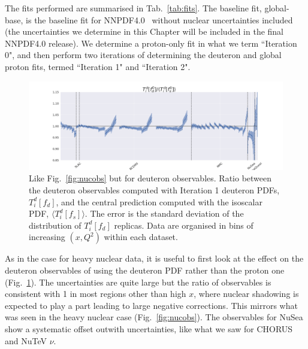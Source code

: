 The fits performed are summarised in Tab.~\ref{tab:fits}. The baseline fit, global-base, is the baseline fit for NNPDF4.0~\cite{EmanueleTalk} without nuclear uncertainties included (the uncertainties we determine in this Chapter will be included in the final NNPDF4.0 release). We determine a proton-only fit in what we term ``Iteration 0", and then perform two iterations of determining the deuteron and global proton fits, termed ``Iteration 1" and ``Iteration 2". 
\begin{figure}[h]
  \begin{center}
    \includegraphics[width=\linewidth, trim={4cm 0 4cm 0}]{nuclear/plots/observable_ratio_updated.png}
   \caption{ Like Fig.~\ref{fig:nucobs} but for deuteron observables. Ratio between the deuteron observables computed with Iteration 1 deuteron PDFs, $T_i^d[f_d]$, and the central prediction computed with the isoscalar PDF, $\langle T_i^d[f_s] \rangle$. The error is the standard deviation of the distribution of $T_i^d[f_d]$ replicas. Data are organised in bins of increasing $(x, Q^2)$ within each dataset. 
    \label{fig:deutobs} }
  \end{center}
\end{figure}

As in the case for heavy nuclear data, it is useful to first look at the effect on the deuteron observables of using the deuteron PDF rather than the proton one (Fig.~\ref{fig:deutobs}). The uncertainties are quite large but the ratio of observables is consistent with 1 in most regions other than high $x$, where nuclear shadowing is expected to play a part leading to large negative corrections. This mirrors what was seen in the heavy nuclear case (Fig.~\ref{fig:nucobs}). The observables for NuSea show a systematic offset outwith uncertainties, like what we saw for CHORUS and NuTeV $\nu$.


